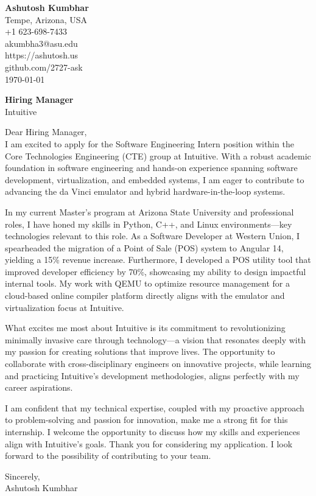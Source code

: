 \documentclass[11pt]{article}
\begin{document}
\begin{flushleft}
\textbf{Ashutosh Kumbhar} \\
Tempe, Arizona, USA \\
+1 623-698-7433 \\
akumbha3@asu.edu \\
https://ashutosh.us \\
github.com/2727-ask \\
\today
\end{flushleft}

\vspace{0.5em}

\textbf{Hiring Manager} \\
Intuitive \\

\vspace{1em}

Dear Hiring Manager, \\

I am excited to apply for the Software Engineering Intern position within the Core Technologies Engineering (CTE) group at Intuitive. With a robust academic foundation in software engineering and hands-on experience spanning software development, virtualization, and embedded systems, I am eager to contribute to advancing the da Vinci emulator and hybrid hardware-in-the-loop systems.  

In my current Master’s program at Arizona State University and professional roles, I have honed my skills in Python, C++, and Linux environments—key technologies relevant to this role. As a Software Developer at Western Union, I spearheaded the migration of a Point of Sale (POS) system to Angular 14, yielding a 15\% revenue increase. Furthermore, I developed a POS utility tool that improved developer efficiency by 70\%, showcasing my ability to design impactful internal tools. My work with QEMU to optimize resource management for a cloud-based online compiler platform directly aligns with the emulator and virtualization focus at Intuitive.

What excites me most about Intuitive is its commitment to revolutionizing minimally invasive care through technology—a vision that resonates deeply with my passion for creating solutions that improve lives. The opportunity to collaborate with cross-disciplinary engineers on innovative projects, while learning and practicing Intuitive's development methodologies, aligns perfectly with my career aspirations.  

I am confident that my technical expertise, coupled with my proactive approach to problem-solving and passion for innovation, make me a strong fit for this internship. I welcome the opportunity to discuss how my skills and experiences align with Intuitive's goals. Thank you for considering my application. I look forward to the possibility of contributing to your team.  

Sincerely, \\
Ashutosh Kumbhar  
\end{document}
